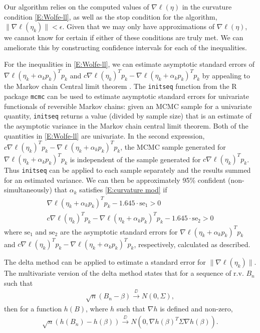 Our algorithm relies on the computed values of $\nabla \ell(\eta)$ in the curvature 
condition \eqref{E:Wolfe-ll}, 
as well as the stop condition for the algorithm, $\lVert \nabla \ell( \eta_k ) \rVert 
< \epsilon$.  Given that we may 
only have approximations of $\nabla \ell(\eta)$, we cannot know for certain if either 
of these conditions are truly 
met.  We can ameliorate this by constructing confidence intervals for each of the 
inequalities.  

For the inequalities in \eqref{E:Wolfe-ll}, we can estimate asymptotic standard 
errors of $\nabla \ell( \eta_k + 
\alpha_k p_k)^T p_k$  and $c \nabla \ell(\eta_k)^T p_k - \nabla \ell( \eta_k + 
\alpha_k p_k)^T p_k$ by appealing to the 
Markov chain Central limit theorem 
\citep{Chan:1994,Jones:2004,Roberts:1997,Roberts:2004}.
The \texttt{initseq} function from the R package \texttt{mcmc} \citep{mcmc:R} can be 
used to estimate asymptotic 
standard errors for univariate functionals of reversible Markov chains: given an MCMC 
sample for a univariate 
quantity, \texttt{initseq}
returns a value (divided by sample size) that is an estimate of the asymptotic 
variance in the Markov chain central 
limit theorem.  Both of the quantities in \eqref{E:Wolfe-ll} are univariate.  In 
the second expression, $c \nabla \ell(\eta_k)^T 
p_k - \nabla \ell( \eta_k + \alpha_k p_k)^T p_k$, the MCMC sample generated for $
\nabla \ell( \eta_k + \alpha_k p_k)^T 
p_k$ is independent of the sample generated for $c \nabla \ell(\eta_k)^T p_k$.  Thus 
\texttt{initseq} can be applied 
to each sample separately and the results summed for an estimated variance.  
We can then be approximately 95\% confident (non-simultaneously) that $\alpha_k$ 
satisfies \eqref{E:curvature 
mod} if
\begin{align*}
	 \nabla \ell( \eta_k + \alpha_k p_k)^T p_k - 1.645 \cdot \text{se}_1 > 0 \\
	 c \nabla \ell(\eta_k)^T p_k - \nabla \ell( \eta_k + \alpha_k p_k)^T p_k - 1.645 
\cdot \text{se}_2 > 0 
\end{align*}
where $\text{se}_1$ and $\text{se}_2$ are the asymptotic standard errors for $\nabla 
\ell( \eta_k + \alpha_k p_k)^T p_k
$  and $c \nabla \ell(\eta_k)^T p_k - \nabla \ell( \eta_k + \alpha_k p_k)^T p_k$, 
respectively, calculated as described.

The delta method can be applied to estimate a standard error for $\lVert \nabla \ell
( \eta_k ) \rVert$. 
The multivariate version of the delta method states that for a sequence of r.v. $B_n$ 
such that
\begin{align*}
	\sqrt{n} ( B_n - \beta) \stackrel{\DD}{\longrightarrow} N( 0, \Sigma ),
\end{align*}
then for a function $h(B)$, where $h$ such that $\nabla h$ is defined and non-zero,
\begin{align*}
	\sqrt{n} \left ( h(B_n) - h(\beta) \right ) \stackrel{\DD}{\longrightarrow} N 
\left ( 0, \nabla h( \beta)^T \Sigma\nabla h( \beta)  \right ).
\end{align*}

